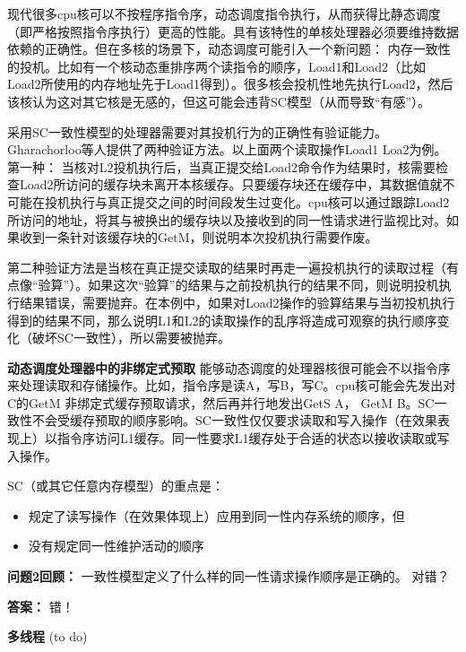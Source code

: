 \documentclass[UTF-8]{ctexrep}
\begin{document}
\par 现代很多cpu核可以不按程序指令序，动态调度指令执行，从而获得比静态调度（即严格按照指令序执行）更高的性能。具有该特性的单核处理器必须要维持数据依赖的正确性。但在多核的场景下，动态调度可能引入一个新问题： 内存一致性的投机。比如有一个核动态重排序两个读指令的顺序，Load1和Load2（比如Load2所使用的内存地址先于Load1得到）。很多核会投机性地先执行Load2，然后该核认为这对其它核是无感的，但这可能会违背SC模型（从而导致“有感”）。
\par 采用SC一致性模型的处理器需要对其投机行为的正确性有验证能力。Gharachorloo等人提供了两种验证方法。以上面两个读取操作Load1 Loa2为例。第一种： 当核对L2投机执行后，当真正提交给Load2命令作为结果时，核需要检查Load2所访问的缓存块未离开本核缓存。只要缓存块还在缓存中，其数据值就不可能在投机执行与真正提交之间的时间段发生过变化。cpu核可以通过跟踪Load2所访问的地址，将其与被换出的缓存块以及接收到的同一性请求进行监视比对。如果收到一条针对该缓存块的GetM，则说明本次投机执行需要作废。
\par 第二种验证方法是当核在真正提交读取的结果时再走一遍投机执行的读取过程（有点像“验算”）。如果这次“验算”的结果与之前投机执行的结果不同，则说明投机执行结果错误，需要抛弃。在本例中，如果对Load2操作的验算结果与当初投机执行得到的结果不同，那么说明L1和L2的读取操作的乱序将造成可观察的执行顺序变化（破坏SC一致性），所以需要被抛弃。
\par \textbf{动态调度处理器中的非绑定式预取}
能够动态调度的处理器核很可能会不以指令序来处理读取和存储操作。比如，指令序是读A，写B，写C。cpu核可能会先发出对C的GetM 非绑定式缓存预取请求，然后再并行地发出GetS A， GetM B。SC一致性不会受缓存预取的顺序影响。SC一致性仅仅要求读取和写入操作（在效果表现上）以指令序访问L1缓存。同一性要求L1缓存处于合适的状态以接收读取或写入操作。
\par SC（或其它任意内存模型）的重点是：
\begin{itemize}
\item 规定了读写操作（在效果体现上）应用到同一性内存系统的顺序，但
\item 没有规定同一性维护活动的顺序
\end{itemize}
\begin{sidebarbox}
\par \textbf {问题2回顾：} 一致性模型定义了什么样的同一性请求操作顺序是正确的。 对错？
\par \textbf{答案：} 错！
\end{sidebarbox}

\par \textbf{多线程}
(to do)
\end{document}
